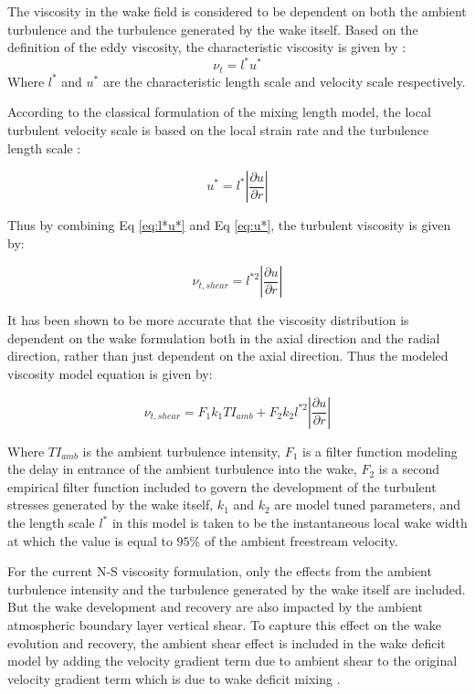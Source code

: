 \documentclass{umthesis}
\begin{document}
The viscosity in the wake field is considered to be dependent on both the ambient turbulence and the turbulence generated by the wake itself. Based on the definition of the eddy viscosity, the characteristic viscosity is given by \cite{Pope}:
\begin{equation}\label{eq:l*u*}
  \nu_t=l^*u^*
\end{equation}
Where $l^*$ and $u^*$ are the characteristic length scale and velocity scale respectively.

According to the classical formulation of the mixing length model, the local turbulent velocity scale is based on the local strain rate and the turbulence length scale \cite{Pope}:

\begin{equation}\label{eq:u*}
  u^*=l^*|\frac{\partial u}{\partial r}|
\end{equation}

Thus by combining Eq \ref{eq:l*u*} and Eq \ref{eq:u*}, the turbulent viscosity is given by:

\begin{equation}
  \nu_{t,shear}=l^{*2}|\frac{\partial u}{\partial r}|
\end{equation}

It has been shown to be more accurate that the viscosity distribution is dependent on the wake formulation both in the axial direction and the radial direction, rather than just dependent on the axial direction. Thus the modeled viscosity model equation is given by:

\begin{equation}
  \nu_{t,shear}=F_1k_1TI_{amb}+F_2k_2l^{*2}|\frac{\partial u}{\partial r}|
\end{equation}

Where $TI_{amb}$ is the ambient turbulence intensity, $F_1$ is a filter function modeling the delay in entrance of the ambient turbulence into the wake, $F_2$ is a second empirical filter function included to govern the development of the turbulent stresses generated by the wake itself, $k_1$ and $k_2$ are model tuned parameters, and the length scale $l^*$ in this model is taken to be the instantaneous local wake width at which the value is equal to $95\%$ of the ambient freestream velocity.

For the current N-S viscosity formulation, only the effects from the ambient turbulence intensity and the turbulence generated by the wake itself are included. But the wake development and recovery are also impacted by the ambient atmospheric boundary layer vertical shear. To capture this effect on the wake evolution and recovery, the ambient shear effect is included in the wake deficit model by adding the velocity gradient term due to ambient shear to the original velocity gradient term which is due to wake deficit mixing \cite{Keck_two}.
\end{document}
